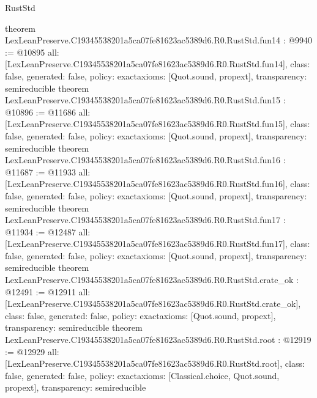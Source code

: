 \begin{lexlean}{RustStd}
\begin{coremodule}
{}
theorem LexLeanPreserve.C19345538201a5ca07fe81623ac5389d6.R0.RustStd.fun14 : @9940 := @10895 {
  all: [LexLeanPreserve.C19345538201a5ca07fe81623ac5389d6.R0.RustStd.fun14],
  class: false,
  generated: false,
  policy: exact{axioms: [Quot.sound, propext]},
  transparency: semireducible
}
theorem LexLeanPreserve.C19345538201a5ca07fe81623ac5389d6.R0.RustStd.fun15 : @10896 := @11686 {
  all: [LexLeanPreserve.C19345538201a5ca07fe81623ac5389d6.R0.RustStd.fun15],
  class: false,
  generated: false,
  policy: exact{axioms: [Quot.sound, propext]},
  transparency: semireducible
}
theorem LexLeanPreserve.C19345538201a5ca07fe81623ac5389d6.R0.RustStd.fun16 : @11687 := @11933 {
  all: [LexLeanPreserve.C19345538201a5ca07fe81623ac5389d6.R0.RustStd.fun16],
  class: false,
  generated: false,
  policy: exact{axioms: [Quot.sound, propext]},
  transparency: semireducible
}
theorem LexLeanPreserve.C19345538201a5ca07fe81623ac5389d6.R0.RustStd.fun17 : @11934 := @12487 {
  all: [LexLeanPreserve.C19345538201a5ca07fe81623ac5389d6.R0.RustStd.fun17],
  class: false,
  generated: false,
  policy: exact{axioms: [Quot.sound, propext]},
  transparency: semireducible
}
theorem LexLeanPreserve.C19345538201a5ca07fe81623ac5389d6.R0.RustStd.crate_ok : @12491 := @12911 {
  all: [LexLeanPreserve.C19345538201a5ca07fe81623ac5389d6.R0.RustStd.crate_ok],
  class: false,
  generated: false,
  policy: exact{axioms: [Quot.sound, propext]},
  transparency: semireducible
}
theorem LexLeanPreserve.C19345538201a5ca07fe81623ac5389d6.R0.RustStd.root : @12919 := @12929 {
  all: [LexLeanPreserve.C19345538201a5ca07fe81623ac5389d6.R0.RustStd.root],
  class: false,
  generated: false,
  policy: exact{axioms: [Classical.choice, Quot.sound, propext]},
  transparency: semireducible
}


\end{coremodule}
\end{lexlean}
